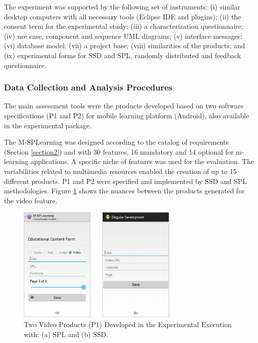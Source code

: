 The experiment was supported by the following set of instruments: (i) similar desktop computers with all necessary tools (Eclipse IDE and plugins); (ii) the consent term for the experimental study; (iii) a characterization questionnaire; (iv) use case, component and sequence UML diagrams; (v) interface messages; (vi) database model; (vii) a project base; (viii) similarities of the products; and (ix) experimental forms for SSD and SPL, randomly distributed and feedback questionnaire.

\subsubsection{Data Collection and Analysis Procedures}

The main assessment tools were the products developed based on two software specifications (P1 and P2) for mobile learning platform (Android), also available in the experimental package.

The M-SPLear\allowbreak ning was designed according to the catalog of requirements (Section \ref{section2}) and with 30 features, 16 mandatory and 14 optional for m-learning applications. A specific niche of features was used for the evaluation. The variabilities related to multimedia resources enabled the creation of up to 15 different products. P1 and P2 were specified and implemented by SSD and SPL methodologies. Figure \ref{fig:prod} shows the nuances between the products generated for the video feature.


\begin{figure}[!ht]
\centering
\includegraphics[width=0.69\textwidth]{MSPLGeneratedProducts.png}
\centering
\caption{Two Video Products (P1) Developed in the Experimental Execution with: (a) SPL and (b) SSD.}
\label{fig:prod}
\end{figure}


